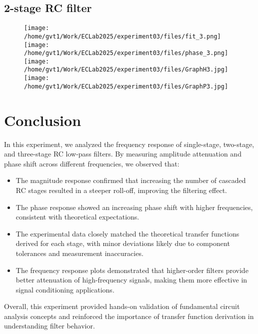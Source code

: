 \documentclass[a4paper,12pt]{article}
\begin{document}
\subsection{2-stage RC filter}
\begin{figure}[!ht]
\centering
  \texttt{[image: /home/gvt1/Work/ECLab2025/experiment03/files/fit\_3.png]}
  \texttt{[image: /home/gvt1/Work/ECLab2025/experiment03/files/phase\_3.png]}
  \texttt{[image: /home/gvt1/Work/ECLab2025/experiment03/files/GraphH3.jpg]}
  \texttt{[image: /home/gvt1/Work/ECLab2025/experiment03/files/GraphP3.jpg]}
\end{figure}
\section{Conclusion}
In this experiment, we analyzed the frequency response of single-stage, two-stage, and three-stage RC low-pass filters. By measuring amplitude attenuation and phase shift across different frequencies, we observed that:  

\begin{itemize}  
    \item The magnitude response confirmed that increasing the number of cascaded RC stages resulted in a steeper roll-off, improving the filtering effect.  
    \item The phase response showed an increasing phase shift with higher frequencies, consistent with theoretical expectations.  
    \item The experimental data closely matched the theoretical transfer functions derived for each stage, with minor deviations likely due to component tolerances and measurement inaccuracies.  
    \item The frequency response plots demonstrated that higher-order filters provide better attenuation of high-frequency signals, making them more effective in signal conditioning applications.  
\end{itemize}  

Overall, this experiment provided hands-on validation of fundamental circuit analysis concepts and reinforced the importance of transfer function derivation in understanding filter behavior.
\end{document}
